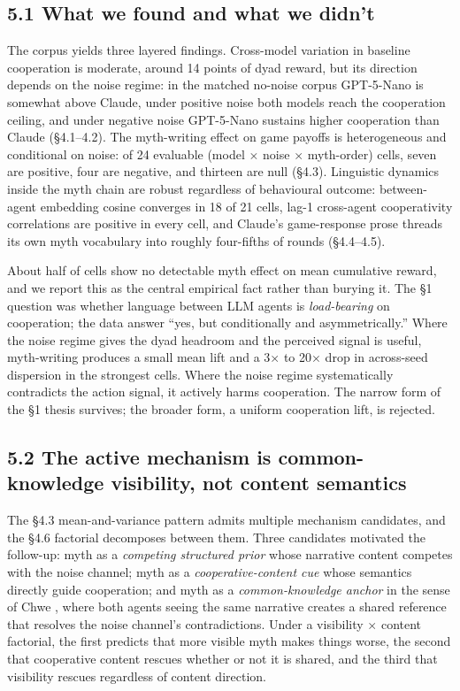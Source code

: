 \documentclass[10pt,letterpaper]{article}
\begin{document}
\subsection{5.1 What we found and what we
didn't}\label{what-we-found-and-what-we-didnt}

The corpus yields three layered findings. Cross-model variation in
baseline cooperation is moderate, around 14 points of dyad reward, but
its direction depends on the noise regime: in the matched no-noise
corpus GPT-5-Nano is somewhat above Claude, under positive noise both
models reach the cooperation ceiling, and under negative noise
GPT-5-Nano sustains higher cooperation than Claude (§4.1--4.2). The
myth-writing effect on game payoffs is heterogeneous and conditional on
noise: of 24 evaluable (model \(\times\) noise \(\times\) myth-order)
cells, seven are positive, four are negative, and thirteen are null
(§4.3). Linguistic dynamics inside the myth chain are robust regardless
of behavioural outcome: between-agent embedding cosine converges in 18
of 21 cells, lag-1 cross-agent cooperativity correlations are positive
in every cell, and Claude's game-response prose threads its own myth
vocabulary into roughly four-fifths of rounds (§4.4--4.5).

About half of cells show no detectable myth effect on mean cumulative
reward, and we report this as the central empirical fact rather than
burying it. The §1 question was whether language between LLM agents is
\emph{load-bearing} on cooperation; the data answer ``yes, but
conditionally and asymmetrically.'' Where the noise regime gives the
dyad headroom and the perceived signal is useful, myth-writing produces
a small mean lift and a 3\(\times\) to 20\(\times\) drop in across-seed
dispersion in the strongest cells. Where the noise regime systematically
contradicts the action signal, it actively harms cooperation. The narrow
form of the §1 thesis survives; the broader form, a uniform cooperation
lift, is rejected.

\subsection{5.2 The active mechanism is common-knowledge visibility, not
content
semantics}\label{the-active-mechanism-is-common-knowledge-visibility-not-content-semantics}

The §4.3 mean-and-variance pattern admits multiple mechanism candidates,
and the §4.6 factorial decomposes between them. Three candidates
motivated the follow-up: myth as a \emph{competing structured prior}
whose narrative content competes with the noise channel; myth as a
\emph{cooperative-content cue} whose semantics directly guide
cooperation; and myth as a \emph{common-knowledge anchor} in the sense
of Chwe \citep{chwe2001}, where both agents seeing the same narrative
creates a shared reference that resolves the noise channel's
contradictions. Under a visibility \(\times\) content factorial, the
first predicts that more visible myth makes things worse, the second
that cooperative content rescues whether or not it is shared, and the
third that visibility rescues regardless of content direction.
\end{document}
